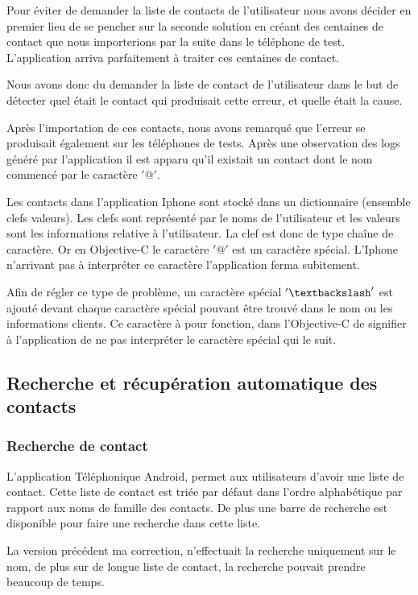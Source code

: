 Pour éviter de demander la liste de contacts de l'utilisateur nous avons décider en premier lieu de se pencher sur la seconde solution en créant des centaines de contact que nous importerions par la suite dans le téléphone de test. L'application arriva parfaitement à traiter ces centaines de contact.

Nous avons donc du demander la liste de contact de l'utilisateur dans le but de détecter quel était le contact qui produisait cette erreur, et quelle était la cause.

Après l'importation de ces contacts, nous avons remarqué que l'erreur se produisait également  sur les téléphones de tests. Après une observation des logs généré par l'application il est apparu qu'il existait un contact dont le nom commencé par le caractère $'@'$.

Les contacts dans l'application Iphone sont stocké dans un dictionnaire (ensemble clefs valeurs). Les clefs sont représenté par le noms de l'utilisateur et les valeurs sont les informations relative à l'utilisateur. La clef est donc de type chaîne de caractère. Or en Objective-C le caractère $'@'$ est un caractère spécial. L'Iphone n'arrivant pas à interpréter ce caractère l'application ferma subitement.

Afin de régler ce type de problème, un caractère spécial $'\textbackslash'$ est ajouté devant chaque caractère spécial pouvant être trouvé dans le nom ou les informations clients. Ce caractère à pour fonction, dans l'Objective-C de signifier à l'application de ne pas interpréter le caractère spécial qui le suit. 

\subsection{Recherche et récupération automatique des contacts}


\subsubsection{Recherche de contact}

L'application Téléphonique Android, permet aux utilisateurs d'avoir une liste de contact. Cette liste de contact est triée par défaut dans l'ordre alphabétique par rapport aux noms de famille des contacts. De plus une barre de recherche est disponible pour faire une recherche dans cette liste.

La version précédent ma correction, n'effectuait la recherche uniquement sur le nom, de plus sur de longue liste de contact, la recherche pouvait prendre beaucoup de temps.

